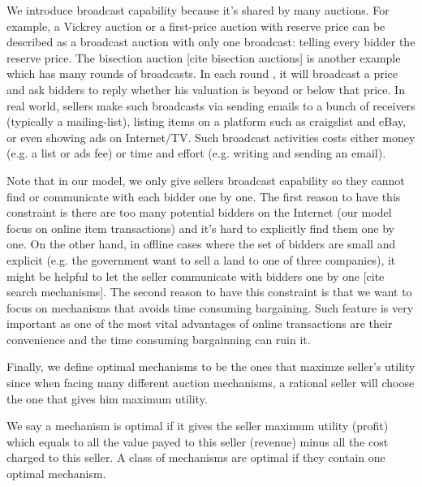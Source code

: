 We introduce broadcast capability because it's shared by many auctions.  For
example, a Vickrey auction or a first-price auction with reserve price can be
described as a broadcast auction with only one broadcast: telling every bidder
the reserve price. The bisection auction [cite bisection auctions] is another
example which has many rounds of broadcasts. In each round , it will broadcast
a price and ask bidders to reply whether his valuation is beyond or below that
price.  In real world, sellers make such broadcasts via sending emails to a
bunch of receivers (typically a mailing-list), listing items on a platform such
as craigslist and eBay, or even showing ads on Internet/TV. Such broadcast
activities costs either money (e.g. a list or ads fee) or time and effort (e.g.
writing and sending an email).

Note that in our model, we only give sellers broadcast capability so they
cannot find or communicate with each bidder one by one. The first reason to
have this constraint is there are too many potential bidders on the Internet
(our model focus on online item transactions) and it's hard to explicitly find
them one by one. On the other hand, in offline cases where the set of bidders
are small and explicit (e.g. the government want to sell a land to one of three
companies), it might be helpful to let the seller communicate with bidders one
by one [cite search mechanisms]. The second reason to have this constraint is
that we want to focus on mechanisms that avoids time consuming bargaining. Such
feature is very important as one of the most vital advantages of online
transactions are their convenience and the time consuming bargainning can ruin
it.

Finally, we define optimal mechanisms to be the ones that maximze seller's
utility since when facing many different auction mechanisms, a rational seller
will choose the one that gives him maximum utility.

\begin{definition}

We say a mechanism is optimal if it gives the seller maximum utility (profit)
which equals to all the value payed to this seller (revenue) minus all the cost charged
to this seller. A class of mechanisms are optimal if they contain one optimal
mechanism.

\end{definition}
